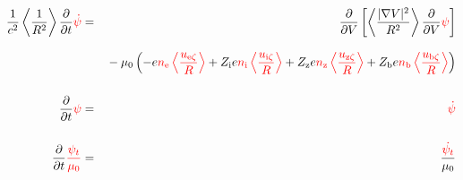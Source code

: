 \documentclass[11pt]{article}
\def\r#1{{\rm#1}}
\def\ave#1{\left\langle#1\right\rangle}
\def\aves#1{\langle#1\rangle}
\def\para{\parallel}
\def\ddV{\frac{\partial}{\partial V}}
\def\ddt{\frac{\partial}{\partial t}}
\def\psid{\dot{\psi}}
\def\psit{\psi_t}
\def\psitd{\dot{\psit}}
\def\nee{n_\r{e}}
\def\ni{n_\r{i}}
\def\nz{n_\r{z}}
\def\nb{n_\r{b}}
\def\Zi{Z_\r{i}}
\def\Zz{Z_\r{z}}
\def\Zb{Z_\r{b}}
\def\uzt#1{u_{\r{#1}\zeta}}
\def\upara#1{u_{\r{#1}\para}}
\def\red#1{\textcolor{red}{#1}}
\begin{document}
\begin{eqnarray}
  \frac{1}{c^2} \ave{\frac{1}{R^2}} \ddt \red{\psid} &=&
%
  \ddV \left[ \ave{\frac{|\nabla V|^2}{R^2}}
				    \ddV \red{\psi} \right] \nonumber\\[3mm]&&{}
%
  - \mu_0 \left(-     e \red{\nee \ave{\frac{\uzt{e}}{R}}}
                + \Zi e \red{\ni  \ave{\frac{\uzt{i}}{R}}}
                + \Zz e \red{\nz  \ave{\frac{\uzt{z}}{R}}}
	        + \Zb e \red{\nb  \ave{\frac{\uzt{b}}{R}}} \right)
%
\\[5mm]
  \ddt \red{\psi} &=&
%
  \red{\psid}
\\[5mm]
  \ddt \red{\frac{\psit}{\mu_0}} &=&
%
  \frac{\red{\psitd}}{\mu_0}
\end{eqnarray}
%
\end{document}
